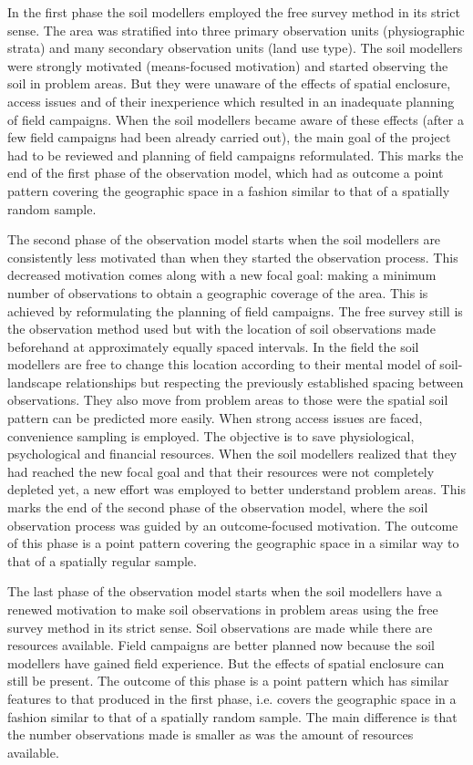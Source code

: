In the first phase the soil modellers employed the free survey method in its strict sense. The area was 
stratified into three primary observation units (physiographic strata) and many secondary observation units 
(land use type). The soil modellers were strongly motivated (means-focused motivation) and started observing 
the soil in problem areas. But they were unaware of the effects of spatial enclosure, access issues and of 
their inexperience which resulted in an inadequate planning of field campaigns. When the soil modellers became
aware of these effects (after a few field campaigns had been already carried out), the main goal of the 
project had to be reviewed and planning of field campaigns reformulated. This marks the end of the first phase 
of the observation model, which had as outcome a point pattern covering the geographic space in a fashion 
similar to that of a spatially random sample.

The second phase of the observation model starts when the soil modellers are consistently less motivated than 
when they started the observation process. This decreased motivation comes along with a new focal goal: making 
a minimum number of observations to obtain a  geographic coverage of the area. This is achieved 
by
reformulating the planning of field campaigns. The free survey still is the observation method used but with 
the location of soil observations made beforehand at approximately equally spaced intervals. In the field the 
soil modellers are free to change this location according to their mental model of soil-landscape 
relationships but respecting the previously established spacing between observations. They also move from 
problem areas to those were the spatial soil pattern can be predicted more easily. When strong access issues 
are faced, convenience sampling is employed. The objective is to save physiological, psychological and 
financial resources. When the soil modellers realized that they had reached the new focal goal and that their
resources were not completely depleted yet, a new effort was employed to better understand problem areas. This 
marks the end of the second phase of the observation model, where the soil observation process was guided by an
outcome-focused motivation. The outcome of this phase is a point pattern covering the geographic space in a 
similar way to that of a spatially regular sample.

The last phase of the observation model starts when the soil modellers have a renewed motivation to make soil 
observations in problem areas using the free survey method in its strict sense. Soil observations are made 
while there are resources available. Field campaigns are better planned now because the soil modellers have 
gained field experience. But the effects of spatial enclosure can still be present. The outcome of 
this phase is a point pattern which has similar features to that produced in the first phase, i.e. covers the 
geographic space in a fashion similar to that of a spatially random sample. The main difference is that the 
number observations made is smaller as was the amount of resources available.


